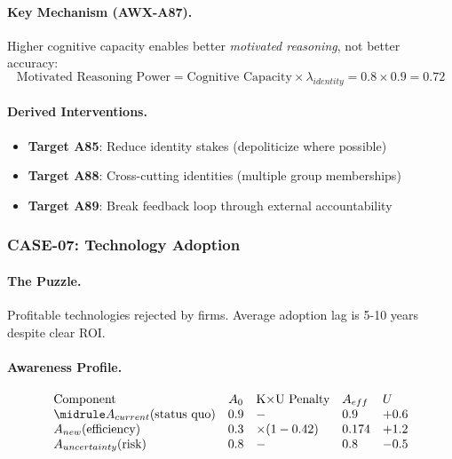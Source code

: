 \paragraph{Key Mechanism (AWX-A87).}
Higher cognitive capacity enables better \emph{motivated reasoning}, not better accuracy:
\begin{equation}
\text{Motivated Reasoning Power} = \text{Cognitive Capacity} \times \lambda_{identity} = 0.8 \times 0.9 = 0.72
\end{equation}

\paragraph{Derived Interventions.}
\begin{itemize}
    \item \textbf{Target A85}: Reduce identity stakes (depoliticize where possible)
    \item \textbf{Target A88}: Cross-cutting identities (multiple group memberships)
    \item \textbf{Target A89}: Break feedback loop through external accountability
\end{itemize}


\subsubsection{CASE-07: Technology Adoption}

\paragraph{The Puzzle.}
Profitable technologies rejected by firms. Average adoption lag is 5-10 years despite clear ROI.

\paragraph{Awareness Profile.}

\begin{equation}
\begin{array}{lclll}
\text{Component} & A_0 & \text{K×U Penalty} & A_{eff} & U \\
\midrule
A_{current}(\text{status quo}) & 0.9 & - & 0.9 & +0.6 \\
A_{new}(\text{efficiency}) & 0.3 & \times (1-0.42) & 0.174 & +1.2 \\
A_{uncertainty}(\text{risk}) & 0.8 & - & 0.8 & -0.5
\end{array}
\end{equation}

